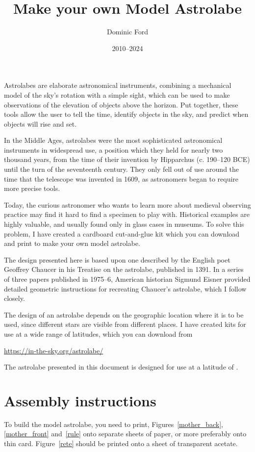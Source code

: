 \documentclass[a4paper,onecolumn,10pt]{article}
\title{Make your own Model Astrolabe}
\author{Dominic Ford}
\date{2010--2024}
\begin{document}
\maketitle
\setcounter{footnote}{1}

Astrolabes are elaborate astronomical instruments, combining a mechanical model
of the sky's rotation with a simple sight, which can be used to make
observations of the elevation of objects above the horizon. Put together, these
tools allow the user to tell the time, identify objects in the sky, and predict
when objects will rise and set.

In the Middle Ages, astrolabes were the most sophisticated astronomical
instruments in widespread use, a position which they held for nearly two
thousand years, from the time of their invention by Hipparchus (c. 190--120
BCE) until the turn of the seventeenth century. They only fell out of use
around the time that the telescope was invented in 1609, as astronomers began
to require more precise tools.

Today, the curious astronomer who wants to learn more about medieval observing
practice may find it hard to find a specimen to play with. Historical examples
are highly valuable, and usually found only in glass cases in museums. To solve
this problem, I have created a cardboard cut-and-glue kit which you can
download and print to make your own model astrolabe.

The design presented here is based upon one described by the English poet
Geoffrey Chaucer in his Treatise on the astrolabe, published in 1391. In a
series of three papers published in 1975--6, American historian Sigmund Eisner
provided detailed geometric instructions for recreating Chaucer's astrolabe,
which I follow closely.

The design of an astrolabe depends on the geographic location where it is to be
used, since different stars are visible from different places. I have created
kits for use at a wide range of latitudes, which you can download from

\url{https://in-the-sky.org/astrolabe/}

The astrolabe presented in this document is designed for use at a latitude of
.

\section*{Assembly instructions}

To build the model astrolabe, you need to print, Figures~\ref{mother_back},
\ref{mother_front} and~\ref{rule} onto separate sheets of paper, or more
preferably onto thin card. Figure~\ref{rete} should be printed onto a sheet of
transparent acetate.
\end{document}
